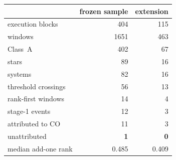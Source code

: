 \begin{tabular}{@{}lrr@{}}
\toprule
 & frozen sample & extension \\
\midrule
execution blocks & 404 & 115 \\
windows & 1651 & 463 \\
\quad Class~A & 402 & 67 \\
stars & 89 & 16 \\
systems & 82 & 16 \\
\midrule
threshold crossings & 56 & 13 \\
rank-first windows & 14 & 4 \\
stage-1 events & 12 & 3 \\
\quad attributed to CO & 11 & 3 \\
\quad unattributed & \textbf{1} & \textbf{0} \\
\midrule
median add-one rank & 0.485 & 0.409 \\
\bottomrule
\end{tabular}
